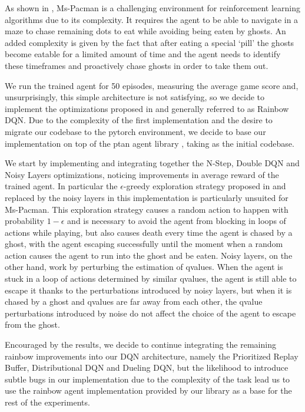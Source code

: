 \documentclass[10pt,twocolumn,letterpaper]{article}
\begin{document}
As shown in \cite{humancontrol}, Ms-Pacman is a challenging environment for reinforcement learning algorithms due to its complexity. It requires the agent to be able to navigate in a maze to chase remaining dots to eat while avoiding being eaten by ghosts. An added complexity is given by the fact that after eating a special `pill' the ghosts become eatable for a limited amount of time and the agent needs to identify these timeframes and proactively chase ghosts in order to take them out.

We run the trained agent for 50 episodes, measuring the average game score and, unsurprisingly, this simple architecture is not satisfying, so we decide to implement the optimizations proposed in \cite{DBLP:journals/corr/abs-1710-02298} and generally referred to as Rainbow DQN. Due to the complexity of the first implementation and the desire to migrate our codebase to the pytorch environment, we decide to base our implementation on top of the ptan agent library \cite{ptan}, taking \cite{packtrepo} as the initial codebase.

We start by implementing and integrating together the N-Step, Double DQN and Noisy Layers optimizations, noticing improvements in average reward of the trained agent. In particular the $\epsilon$-greedy exploration strategy proposed in \cite{DBLP:journals/corr/MnihKSGAWR13} and replaced by the noisy layers in this implementation is particularly unsuited for Ms-Pacman. This exploration strategy causes a random action to happen with probability $1 - \epsilon$ and is necessary to avoid the agent from blocking in loops of actions while playing, but also causes death every time the agent is chased by a ghost, with the agent escaping successfully until the moment when a random action causes the agent to run into the ghost and be eaten.
Noisy layers, on the other hand, work by perturbing the estimation of qvalues. When the agent is stuck in a loop of actions determined by similar qvalues, the agent is still able to escape it thanks to the perturbations introduced by noisy layers, but when it is chased by a ghost and qvalues are far away from each other, the qvalue perturbations introduced by noise do not affect the choice of the agent to escape from the ghost.

Encouraged by the results, we decide to continue integrating the remaining rainbow improvements into our DQN architecture, namely the Prioritized Replay Buffer, Distributional DQN and Dueling DQN, but the likelihood to introduce subtle bugs in our implementation due to the complexity of the task lead us to use the rainbow agent implementation provided by our library as a base for the rest of the experiments.
\end{document}
